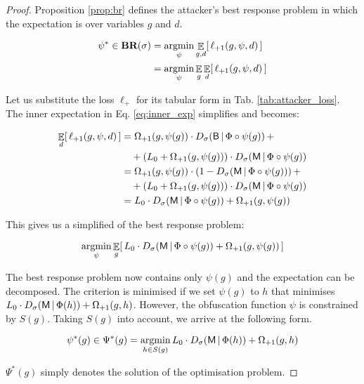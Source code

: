 \begin{proof}
    Proposition \ref{prop:br} defines the attacker's best response problem in which the expectation is over variables $g$ and $d$.

    \begin{align}
        \psi^* \in \textbf{BR}(\sigma) &= \mathop{\text{argmin}}_\psi \mathop{\mathbb{E}}_{g,d} [\, \ell_{{\text{+}1}} (g, \psi, d) \,] \\
        &= \mathop{\text{argmin}}_\psi \mathop{\mathbb{E}}_g \mathop{\mathbb{E}}_d [\, \ell_{{\text{+}1}} (g, \psi, d) \,] \label{eq:inner_exp}
    \end{align}

    Let us substitute the loss $\ell_\plus$ for its tabular form in Tab. \ref{tab:attacker_loss}. The inner expectation in Eq. \ref{eq:inner_exp} simplifies and becomes:

    \begin{align*}
        \mathop{\mathbb{E}}_d [\, \ell_{{\text{+}1}} (g, \psi, d) \,] & = \Omega_{{\text{+}1}} (g, \psi(g) ) \cdot D_\sigma(\mathsf{B} \,|\, \Phi \circ \psi (g)) \, + \\
        & \quad + (L_0 + \Omega_{{\text{+}1}}(g, \psi(g))) \cdot D_\sigma(\mathsf{M} \,|\, \Phi \circ \psi (g)) \\
        & = \Omega_{{\text{+}1}}(g, \psi(g)) \cdot ( 1 - D_\sigma(\mathsf{M} \,|\, \Phi \circ \psi (g)) ) \, + \\
        & \quad + (L_0 + \Omega_{{\text{+}1}}(g, \psi(g))) \cdot D_\sigma(\mathsf{M} \,|\, \Phi \circ \psi (g)) \\
        & = L_0 \cdot D_\sigma(\mathsf{M} \,|\, \Phi \circ \psi (g)) + \Omega_{{\text{+}1}}(g, \psi(g))
    \end{align*}

    This gives us a simplified of the best response problem:

    \begin{equation*}
        \mathop{\text{argmin}}_\psi \mathop{\mathbb{E}}_g [\, L_0 \cdot D_\sigma(\mathsf{M} \,|\, \Phi \circ \psi (g)) + \Omega_{{\text{+}1}}(g, \psi(g)) \,]
    \end{equation*}

    The best response problem now contains only $\psi(g)$ and the expectation can be decomposed. The criterion is minimised if we set $\psi(g)$ to $h$ that minimises $L_0 \cdot D_\sigma(\mathsf{M} \,|\, \Phi (h)) + \Omega_{{\text{+}1}}(g, h)$. However, the obfuscation function $\psi$ is constrained by $S(g)$. Taking $S(g)$ into account, we arrive at the following form.

    \begin{equation*}
        \psi^*(g) \in \Psi^*(g) = \mathop{\text{argmin}}_{h \in S(g)} L_0 \cdot D_\sigma(\mathsf{M} \,|\, \Phi (h) ) + \Omega_{{\text{+}1}}(g, h)
    \end{equation*}

    $\Psi^*(g)$ simply denotes the solution of the optimisation problem.

\end{proof}


